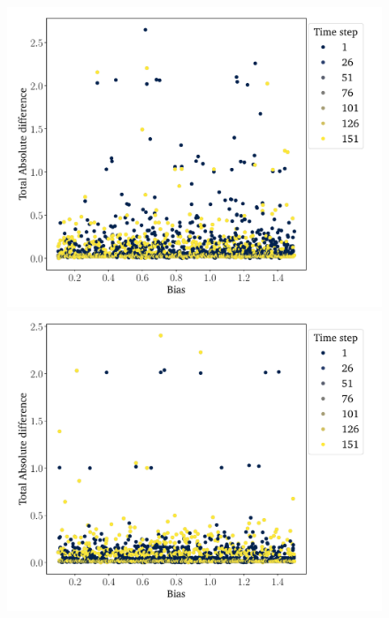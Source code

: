 \begin{figure}
	\centering
	\begin{minipage}{0.45\textwidth}
		\begin{center}
			\includegraphics[width=\textwidth]{Figures/error_scatter_delib.pdf}
		\end{center}
	\end{minipage}
	\hspace{1em}
	\begin{minipage}{0.45\textwidth}
		\begin{center}
			\includegraphics[width=\textwidth]{Figures/error_scatter_control.pdf}
		\end{center}

	\end{minipage}
	\caption{}\label{fig:bias_over_time}
\end{figure}


